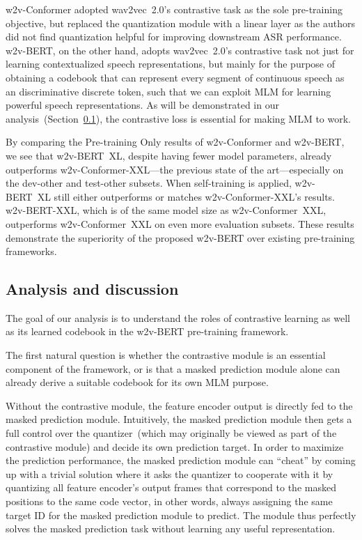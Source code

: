 \documentclass{article}
\begin{document}
w2v-Conformer adopted wav2vec~2.0's contrastive task as the sole pre-training objective, but replaced the quantization module with a linear layer as the authors did not find quantization helpful for improving downstream ASR performance.
w2v-BERT, on the other hand, adopts wav2vec~2.0's contrastive task not just for learning contextualized speech representations, but mainly for the purpose of obtaining a codebook that can represent every segment of continuous speech as an discriminative discrete token, such that we can exploit MLM for learning powerful speech representations.
As will be demonstrated in our analysis~(Section~\ref{sec:analysis}), the contrastive loss is essential for making MLM to work.

By comparing the Pre-training Only results of w2v-Conformer and w2v-BERT, we see that w2v-BERT~XL, despite having fewer model parameters, already outperforms w2v-Conformer-XXL---the previous state of the art---especially on the dev-other and test-other subsets.
When self-training is applied, w2v-BERT~XL still either outperforms or matches w2v-Conformer-XXL's results.
w2v-BERT-XXL, which is of the same model size as w2v-Conformer~XXL, outperforms w2v-Conformer~XXL on even more evaluation subsets.
These results demonstrate the superiority of the proposed w2v-BERT over existing pre-training frameworks.



\subsection{Analysis and discussion}
\label{sec:analysis}
The goal of our analysis is to understand the roles of contrastive learning as well as its learned codebook
in the w2v-BERT pre-training framework.

The first natural question is whether the contrastive module is an essential component of the framework, or is that a masked prediction module alone can already derive a suitable codebook for its own MLM purpose.

Without the contrastive module, the feature encoder output is directly fed to the masked prediction module.
Intuitively, the masked prediction module then gets a full control over the quantizer~(which may originally be viewed as part of the contrastive module) and decide its own prediction target.
In order to maximize the prediction performance, the masked prediction module can ``cheat'' by coming up with a trivial solution where it asks the quantizer to cooperate with it by quantizing all feature encoder's output frames that correspond to the masked positions to the same code vector, in other words, always assigning the same target ID for the masked prediction module to predict.
The module thus perfectly solves the masked prediction task without learning any useful representation.
\end{document}
